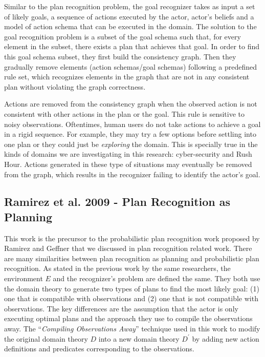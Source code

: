 Similar to the plan recognition problem, the goal recognizer takes as input a set of likely goals, a sequence of actions executed by the actor, actor's beliefs and a model of action schema that can be executed in the domain. The solution to the goal recognition problem is a subset of the goal schema such that, for every element in the subset, there exists a plan that achieves that goal. In order to find this goal schema subset, they first build the consistency graph. Then they gradually remove elements (action schemas/goal schemas) following a predefined rule set, which recognizes elements in the graph that are not in any consistent plan without violating the graph correctness.

Actions are removed from the consistency graph when the observed action is not consistent with other actions in the plan or the goal. This rule is sensitive to noisy observations. Oftentimes, human users do not take actions to achieve a goal in a rigid sequence. For example, they may try a few options before settling into one plan or they could just be \textit{exploring} the domain. This is specially true in the kinds of domains we are investigating in this research: cyber-security and Rush Hour. Actions generated in these type of situations may eventually be removed from the graph, which results in the recognizer failing to identify the actor's goal.

\subsection{Ramirez et al. 2009 - Plan Recognition as Planning}
This work is the precursor to the probabilistic plan recognition work proposed by Ramirez and Geffner that we discussed in plan recognition related work. There are many similarities between plan recognition as planning \cite{ramirez2009plan} and probabilistic plan recognition. As stated in the previous work by the same researchers, the environment $E$ and the recognizer's problem are defined the same. They both use the domain theory to generate two types of plans to find the most likely goal: (1) one that is compatible with observations and (2) one that is not compatible with observations.
The key differences are the assumption that the actor is only executing optimal plans and the approach they use to compile the observations away. The ``\textit{Compiling Observations Away}'' technique used in this work to modify the original domain theory $D$ into a new domain theory $D^\prime$ by adding new action definitions and predicates corresponding to the observations.


